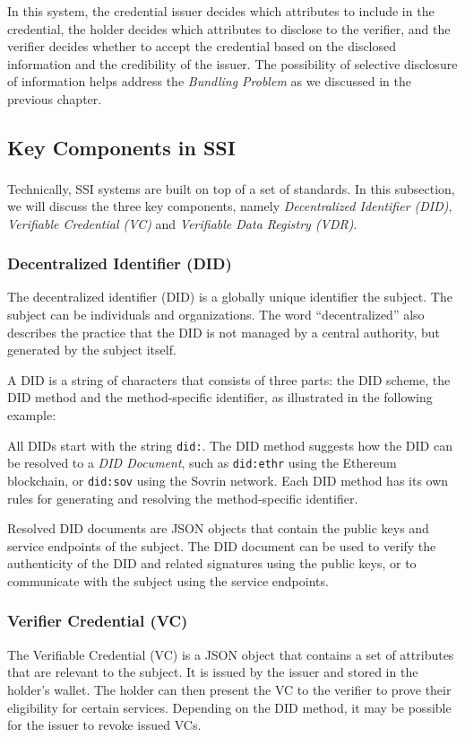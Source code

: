\documentclass[
]{report}
\begin{document}
In this system, the credential issuer decides which attributes to include in
the credential, the holder decides which attributes to disclose to the verifier,
and the verifier decides whether to accept the credential based on the disclosed
information and the credibility of the issuer. The possibility of selective
disclosure of information helps address the \emph{Bundling Problem} as we
discussed in the previous chapter.

\subsection{Key Components in SSI}
Technically, SSI systems are built on top of a set of standards\textsuperscript{\cite{W3CDIDCore,W3CVCDataModel}}.
In this subsection, we will discuss the three key components, namely
\emph{Decentralized Identifier (DID)}, \emph{Verifiable Credential (VC)} and
\emph{Verifiable Data Registry (VDR)}.
\subsubsection{Decentralized Identifier (DID)}
The decentralized identifier (DID) is a globally unique identifier the subject.
The subject can be individuals and organizations. The word ``decentralized'' 
also describes the practice that the DID is not managed by a central authority,
but generated by the subject itself.

A DID is a string of characters that consists of three parts: the DID scheme,
the DID method and the method-specific identifier, as illustrated in the
following example:
\begin{figure}[h]
  
  \centering
\end{figure}
All DIDs start with the string \texttt{did:}. The DID method suggests how the
DID can be resolved to a \emph{DID Document}, such as \texttt{did:ethr} using
the Ethereum blockchain, or \texttt{did:sov} using the Sovrin network.
Each DID method has its own rules for generating and resolving the 
method-specific identifier.

Resolved DID documents are JSON objects that contain the public keys and service
endpoints of the subject. The DID document can be used to verify the authenticity
of the DID and related signatures using the public keys, or to communicate with
the subject using the service endpoints.
\subsubsection{Verifier Credential (VC)}
The Verifiable Credential (VC) is a JSON object that contains a set of attributes
that are relevant to the subject. It is issued by the issuer and stored in the
holder's wallet. The holder can then present the VC to the verifier to prove
their eligibility for certain services. Depending on the DID method, it may be
possible for the issuer to revoke issued VCs.
\end{document}
